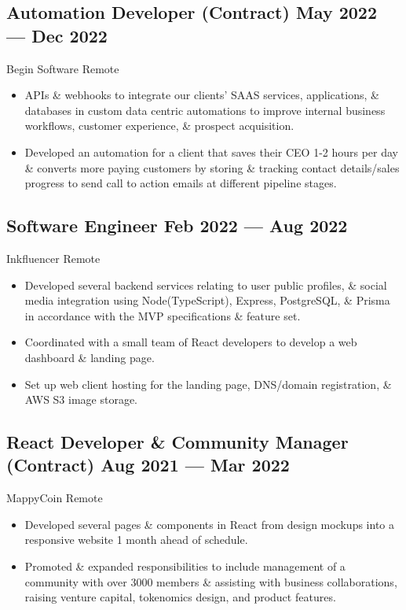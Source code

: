 \documentclass[a4,10pt]{article}
\newcommand{\subtext}[1]{
#1\par\vspace{-0.2cm}}
\newenvironment{zitemize}{
\begin{itemize}\itemsep0pt \parskip0pt \parsep1pt}
{\end{itemize}\vspace{-0.5cm}}
\begin{document}

\subsection*{Automation Developer {\normalsize \normalfont(Contract) } \hfill  May 2022 --- Dec 2022 }
\subtext{Begin Software \hfill Remote }  
    \begin{zitemize}
        \item APIs \& webhooks to integrate our clients' SAAS services, applications, \& databases in custom data centric automations to improve internal business workflows, customer experience, \& prospect acquisition.
        \item Developed an automation for a client that saves their CEO 1-2 hours per day \& converts more paying customers by storing \& tracking contact details/sales progress to send call to action emails at different pipeline stages.
    \end{zitemize}


\subsection*{Software Engineer {\normalsize \normalfont} \hfill  Feb 2022 --- Aug 2022 }
\subtext{Inkfluencer \hfill Remote }  
    \begin{zitemize}
        \item Developed several backend services relating to user public profiles, \& social media integration using Node(TypeScript), Express, PostgreSQL, \& Prisma in accordance with the MVP specifications \& feature set.
        \item Coordinated with a small team of React developers to develop a web dashboard \& landing page.
        \item Set up web client hosting for the landing page, DNS/domain registration, \& AWS S3 image storage.
    \end{zitemize}


\subsection*{React Developer \& Community Manager {\normalsize \normalfont(Contract) } \hfill  Aug 2021 --- Mar 2022 }
\subtext{MappyCoin \hfill Remote } 
    \begin{zitemize}
        \item Developed several pages \& components in React from design mockups into a responsive website 1 month ahead of schedule.
        \item Promoted \& expanded responsibilities to include management of a community with over 3000 members \& assisting with business collaborations, raising venture capital, tokenomics design, and product features.
    \end{zitemize}
\end{document}
